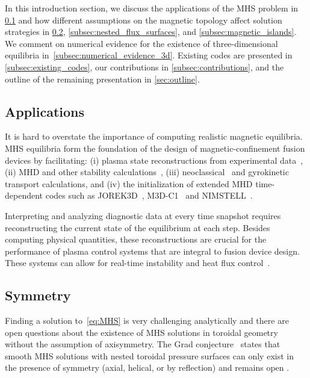 \documentclass[%
 reprint,
 superscriptaddress,
 amsmath,amssymb,
 aps, nofootinbib, floatfix]{revtex4-2}
\begin{document}
In this introduction section, we discuss the applications of the MHS problem in \ref{subsec:applications} and how different assumptions on the magnetic topology affect solution strategies in \ref{subsec:symmetry}, \ref{subsec:nested_flux_surfaces}, and \ref{subsec:magnetic_islands}. We comment on numerical evidence for the existence of three-dimensional equilibria in~\ref{subsec:numerical_evidence_3d}.
Existing codes are presented in \ref{subsec:existing_codes}, our contributions in \ref{subsec:contributions}, and the outline of the remaining presentation in \ref{sec:outline}.

\subsection{Applications}
\label{subsec:applications}

It is hard to overstate the importance of computing realistic magnetic equilibria. MHS equilibria form the foundation of the design of magnetic-confinement fusion devices by facilitating: (i) plasma state reconstructions from experimental data~\cite{lao_reconstruction_1985}, (ii) MHD and other stability calculations~\cite{sanchez_cobra_2000}, (iii) neoclassical~\cite{van_rij_variational_1989} and gyrokinetic~\cite{mandell_gx_2024} transport calculations, and (iv) the initialization of extended MHD time-dependent codes such as JOREK3D~\cite{nikulsin_jorek3d_2022}, {M3D-C1}~\cite{jardin_multiple_2012} and {NIMSTELL}~\cite{sovinec_modeling_2024}.

Interpreting and analyzing diagnostic data at every time snapshot requires reconstructing the current state of the equilibrium at each step. 
Besides computing physical quantities, these reconstructions are crucial for the performance of plasma control systems that are integral to fusion device design. These systems can allow for real-time instability and heat flux control~\cite{goncalves_real-time_2010}. 

\subsection{Symmetry}
\label{subsec:symmetry}

Finding a solution to~\eqref{eq:MHS} is very challenging analytically and there are open questions about the existence of MHS solutions in toroidal geometry without the assumption of axisymmetry. The Grad conjecture~\citep{grad_toroidal_1967} states that smooth MHS solutions with nested toroidal pressure surfaces can only exist in the presence of symmetry (axial, helical, or by reflection) and remains open \citep[Conjecture 1]{constantin_flexibility_2021}.
\end{document}
